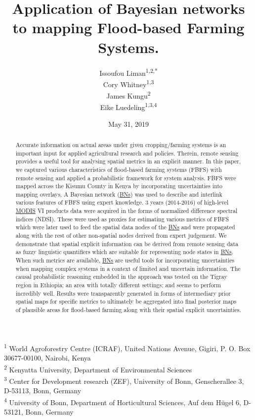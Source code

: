\documentclass[12pt,oneside]{article}
\title{Application of Bayesian networks to mapping Flood-based Farming Systems.}
\author{Issoufou Liman\textsuperscript{1,2,*} \\ Cory Whitney\textsuperscript{1,3} \\ James Kungu\textsuperscript{2} \\ Eike Luedeling\textsuperscript{1,3,4}}
\date{May 31, 2019}
\begin{document}
\maketitle
\begin{abstract}
Accurate information on actual areas under given cropping/farming systems is an important input for applied agricultural research and policies. Therein, remote sensing provides a useful tool for analysing spatial metrics in an explicit manner. In this paper, we captured various characteristics of flood-based farming systems (FBFS) with remote sensing and applied a probabilistic framework for system analysis. FBFS were mapped across the Kisumu County in Kenya by incorporating uncertainties into mapping overlays. A Bayesian network (\href{https://en.wikipedia.org/wiki/Bayesian_network}{BNs}) was used to describe and interlink various features of FBFS using expert knowledge. 3 years (2014-2016) of high-level \href{https://terra.nasa.gov/about/terra-instruments/modis}{MODIS} VI products data were acquired in the forms of normalized difference spectral indices (NDSI). These were used as proxies for estimating various metrics of FBFS which were later used to feed the spatial data nodes of the \href{https://en.wikipedia.org/wiki/Bayesian_network}{BNs} and were propagated along with the rest of other non-spatial nodes derived from expert judgement. We demonstrate that spatial explicit information can be derived from remote sensing data as fuzzy linguistic quantifiers which are suitable for representing node states in \href{https://en.wikipedia.org/wiki/Bayesian_network}{BNs}. When such metrics are available, \href{https://en.wikipedia.org/wiki/Bayesian_network}{BNs} are useful tools for incorporating uncertainties when mapping complex systems in a context of limited and uncertain information. The causal probabilistic reasoning embedded in the approach was tested on the Tigray region in Ethiopia; an area with totally different settings; and seems to perform incredibly well. Results were transparently generated in forms of intermediary prior spatial maps for specific metrics to ultimately be aggregated into final posterior maps of plausible areas for flood-based farming along with their spatial explicit uncertainties.
\end{abstract}

{
\hypersetup{linkcolor=black}
\setcounter{tocdepth}{5}
\tableofcontents
}
\textsuperscript{1} World Agroforestry Centre (ICRAF), United Nations Avenue, Gigiri, P. O. Box 30677-00100, Nairobi, Kenya\\
\textsuperscript{2} Kenyatta University, Department of Environmental Sciences\\
\textsuperscript{3} Center for Development research (ZEF), University of Bonn, Genscherallee 3, D-53113, Bonn, Germany\\
\textsuperscript{4} University of Bonn, Department of Horticultural Sciences, Auf dem Hügel 6, D-53121, Bonn, Germany
\end{document}
